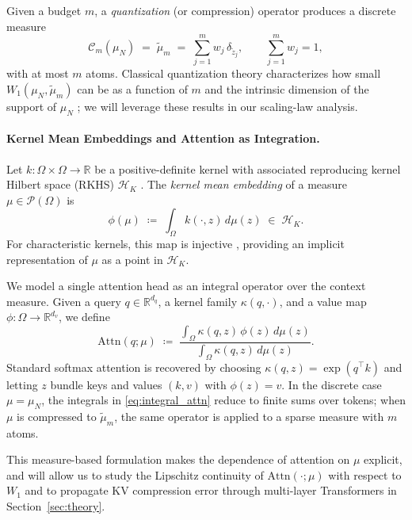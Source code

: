 \documentclass{article}
\theoremstyle{plain}
\theoremstyle{definition}
\theoremstyle{remark}
\newcommand{\R}{\mathbb{R}}
\newcommand{\OmegaSpace}{\Omega} %
\newcommand{\Pspace}{\mathcal{P}(\OmegaSpace)} %
\newcommand{\muN}{\mu_N} %
\newcommand{\tmu}{\tilde{\mu}} %
\newcommand{\Wass}[1]{W_{#1}} %
\newcommand{\Attn}{\text{Attn}}
\newcommand{\valmap}{\phi}
\newcommand{\Compress}{\mathcal{C}_m} %
\begin{document}
Given a budget $m$, a \emph{quantization} (or compression) operator produces a discrete measure
\begin{equation}
    \Compress(\muN) \;=\; \tmu_m \;=\; \sum_{j=1}^{m} w_j \, \delta_{\tilde z_j},
    \qquad \sum_{j=1}^m w_j = 1,
\end{equation}
with at most $m$ atoms.  Classical quantization theory characterizes how small $\Wass{1}(\muN,\tmu_m)$ can be as a function of $m$ and the intrinsic dimension of the support of $\muN$ \citep{graf2000foundations}; we will leverage these results in our scaling-law analysis.

\paragraph{Kernel Mean Embeddings and Attention as Integration.}
Let $k : \OmegaSpace \times \OmegaSpace \to \R$ be a positive-definite kernel with associated reproducing kernel Hilbert space (RKHS) $\mathcal{H}_K$ \citep{muandet2017kernel}.  
The \emph{kernel mean embedding} of a measure $\mu \in \Pspace$ is
\begin{equation}
    \phi(\mu) \;\coloneqq\; \int_{\OmegaSpace} k(\cdot, z)\, d\mu(z) \;\in\; \mathcal{H}_K.
\end{equation}
For characteristic kernels, this map is injective \citep{sriperumbudur2010hilbert}, providing an implicit representation of $\mu$ as a point in $\mathcal{H}_K$.

We model a single attention head as an integral operator over the context measure.  
Given a query $q \in \R^{d_q}$, a kernel family $\kappa(q,\cdot)$, and a value map $\valmap : \OmegaSpace \to \R^{d_v}$, we define
\begin{equation}
    \label{eq:integral_attn}
    \Attn(q; \mu)
    \;\coloneqq\;
    \frac{
        \int_{\OmegaSpace} \kappa(q, z)\,\valmap(z)\, d\mu(z)
    }{
        \int_{\OmegaSpace} \kappa(q, z)\, d\mu(z)
    }.
\end{equation}
Standard softmax attention \citep{vaswani2017attention} is recovered by choosing
$\kappa(q,z) = \exp(q^\top k)$ and letting $z$ bundle keys and values $(k,v)$ with $\valmap(z)=v$.  
In the discrete case $\mu = \muN$, the integrals in \eqref{eq:integral_attn} reduce to finite sums over tokens; when $\mu$ is compressed to $\tmu_m$, the same operator is applied to a sparse measure with $m$ atoms.  

This measure-based formulation makes the dependence of attention on $\mu$ explicit, and will allow us to study the Lipschitz continuity of $\Attn(\cdot;\mu)$ with respect to $\Wass{1}$ and to propagate KV compression error through multi-layer Transformers in Section~\ref{sec:theory}.
\end{document}
